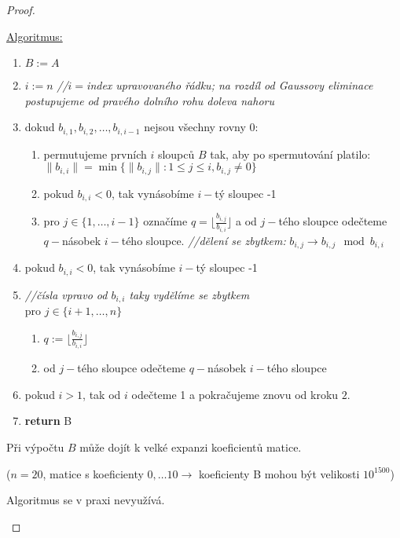 \begin{proof}
\begin{itemize}[label={}]
    \underline{Algoritmus:}
    \begin{enumerate}
        \item $B:= A$
        \item $i:=n$ \textit{//}$i =$\textit{index upravovaného řádku; na rozdíl od Gaussovy eliminace postupujeme od pravého dolního rohu doleva nahoru}
        \item dokud $b_{i,1}, b_{i,2}, \dots, b_{i,i-1}$ nejsou všechny rovny $0$:
        \begin{enumerate}[label=\roman*]
            \item permutujeme prvních $i$ sloupců $B$ tak, aby po spermutování platilo:\\ $\|b_{i,i}\| = \min\{\|b_{i,j}\|: 1 \leq j \leq i, b_{i,j} \neq 0\}$
            \item pokud $b_{i,i} < 0$, tak vynásobíme $i-$tý sloupec -1
            \item pro $j \in \{1, \dots, i-1\}$ označíme $q = \lfloor \frac{b_{i,j}}{b_{i,i}} \rfloor$ a od $j-$tého sloupce odečteme $q-$násobek $i-$tého sloupce. \textit{//dělení se zbytkem: }$b_{i,j} \rightarrow b_{i,j} \mod b_{i,i}$
        \end{enumerate}
        \item pokud $b_{i,i} < 0$, tak vynásobíme $i-$tý sloupec -1
        \item \textit{//čísla vpravo od $b_{i,i}$ taky vydělíme se zbytkem}\\
        pro $j \in \{i+1, \dots, n\}$
        \begin{enumerate}[label=\roman*]
            \item $q := \lfloor \frac{b_{i,j}}{b_{i,i}} \rfloor$
            \item od $j-$tého sloupce odečteme $q-$násobek $i-$tého sloupce
        \end{enumerate}
        \item pokud $i>1$, tak od $i$ odečteme 1 a pokračujeme znovu od kroku $2.$
        \item \textbf{return} B
    \end{enumerate}
    \begin{note}
        Při výpočtu $B$ může dojít k velké expanzi koeficientů matice.
        
        ($n=20$, matice s koeficienty $0,\dots10 \rightarrow$ koeficienty B mohou být velikosti $10^{1500}$)
        
        Algoritmus se v praxi nevyužívá.
    \end{note}
    

\end{itemize}
\end{proof}
